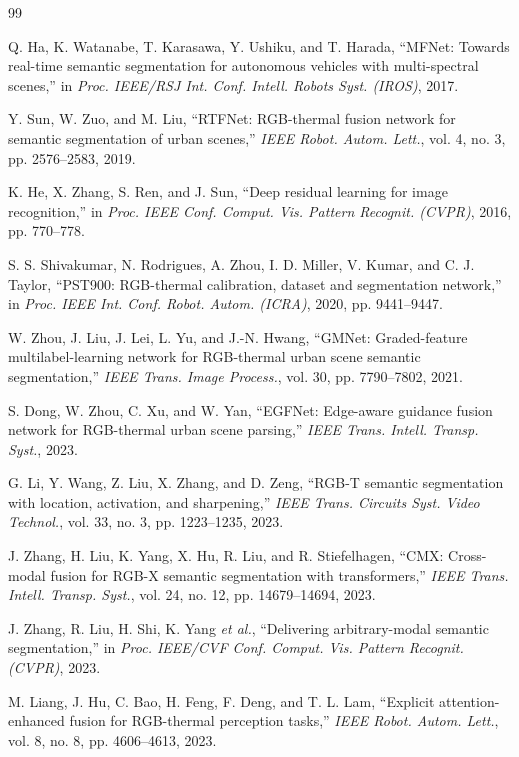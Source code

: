 \documentclass[10pt,conference]{IEEEtran}
\begin{document}
\begin{thebibliography}{99}

 Q. Ha, K. Watanabe, T. Karasawa, Y. Ushiku, and T. Harada, ``MFNet: Towards real-time semantic segmentation for autonomous vehicles with multi-spectral scenes,'' in \textit{Proc. IEEE/RSJ Int. Conf. Intell. Robots Syst. (IROS)}, 2017.

 Y. Sun, W. Zuo, and M. Liu, ``RTFNet: RGB-thermal fusion network for semantic segmentation of urban scenes,'' \textit{IEEE Robot. Autom. Lett.}, vol. 4, no. 3, pp. 2576--2583, 2019.

 K. He, X. Zhang, S. Ren, and J. Sun, ``Deep residual learning for image recognition,'' in \textit{Proc. IEEE Conf. Comput. Vis. Pattern Recognit. (CVPR)}, 2016, pp. 770--778.

 S. S. Shivakumar, N. Rodrigues, A. Zhou, I. D. Miller, V. Kumar, and C. J. Taylor, ``PST900: RGB-thermal calibration, dataset and segmentation network,'' in \textit{Proc. IEEE Int. Conf. Robot. Autom. (ICRA)}, 2020, pp. 9441--9447.

 W. Zhou, J. Liu, J. Lei, L. Yu, and J.-N. Hwang, ``GMNet: Graded-feature multilabel-learning network for RGB-thermal urban scene semantic segmentation,'' \textit{IEEE Trans. Image Process.}, vol. 30, pp. 7790--7802, 2021.

 S. Dong, W. Zhou, C. Xu, and W. Yan, ``EGFNet: Edge-aware guidance fusion network for RGB-thermal urban scene parsing,'' \textit{IEEE Trans. Intell. Transp. Syst.}, 2023.

 G. Li, Y. Wang, Z. Liu, X. Zhang, and D. Zeng, ``RGB-T semantic segmentation with location, activation, and sharpening,'' \textit{IEEE Trans. Circuits Syst. Video Technol.}, vol. 33, no. 3, pp. 1223--1235, 2023.

 J. Zhang, H. Liu, K. Yang, X. Hu, R. Liu, and R. Stiefelhagen, ``CMX: Cross-modal fusion for RGB-X semantic segmentation with transformers,'' \textit{IEEE Trans. Intell. Transp. Syst.}, vol. 24, no. 12, pp. 14679--14694, 2023.

 J. Zhang, R. Liu, H. Shi, K. Yang \textit{et al.}, ``Delivering arbitrary-modal semantic segmentation,'' in \textit{Proc. IEEE/CVF Conf. Comput. Vis. Pattern Recognit. (CVPR)}, 2023.

 M. Liang, J. Hu, C. Bao, H. Feng, F. Deng, and T. L. Lam, ``Explicit attention-enhanced fusion for RGB-thermal perception tasks,'' \textit{IEEE Robot. Autom. Lett.}, vol. 8, no. 8, pp. 4606--4613, 2023.


\end{thebibliography}
\end{document}
